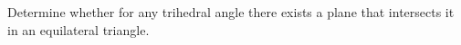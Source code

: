 Determine whether for any trihedral angle there exists a plane that intersects it in an equilateral triangle.

